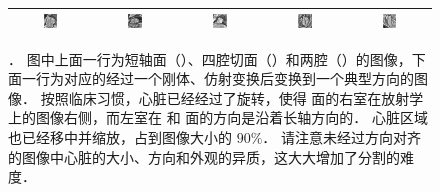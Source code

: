\begin{figure}
\begin{center}
\begin{tabular}{ccccc}
\includegraphics[width=0.19\textwidth]{./data/ohm/control/HCMNet_1100594/00_SAX/35_/im_t.png} &
\includegraphics[width=0.19\textwidth]{./data/ohm/control/HCMNet_1100823/00_SAX/33_/im_t.png} &
\includegraphics[width=0.19\textwidth]{./data/ohm/control/HCMNet_2600035/00_SAX/024_SA_CINE/im_t.png} &
\includegraphics[width=0.19\textwidth]{./data/ohm/control/HCMNet_1700012/01_HLA/00/im_t.png} &
\includegraphics[width=0.19\textwidth]{./data/ohm/control/HCMNet_2100096/02_VLA/00/im_t.png} \\
\bottomrule

\end{tabular}

\caption[\captiontitle]{\captiontitle{}．
图中上面一行为短轴面（\SA{}）、四腔切面（\HLA{}）和两腔（\VLA{}）的图像，下面一行为对应的经过一个刚体、仿射变换后变换到一个典型方向的图像．
按照临床习惯，心脏已经经过了旋转，使得 \SA{} 面的右室在放射学上的图像右侧，而左室在 \HLA{} 和 \VLA{} 面的方向是沿着长轴方向的．
心脏区域也已经移中并缩放，占到图像大小的 $90\%$．
请注意未经过方向对齐的图像中心脏的大小、方向和外观的异质，这大大增加了分割的难度．
}
\label{fig:canonical-orientation}
\end{center}
\end{figure}
